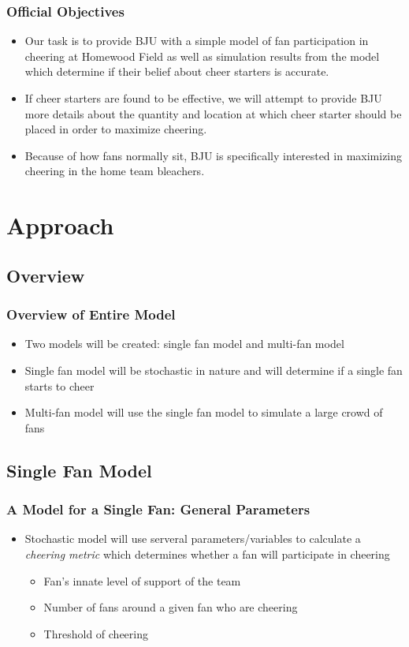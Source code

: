 \documentclass[compress,handout,10pt]{beamer}
\let\olditem\item
\renewcommand{\item}{\setlength{\itemsep}{0.5\baselineskip}\olditem}
\begin{document}
\begin{frame}
	\frametitle {Official Objectives}
	\begin {itemize}
		\item Our task is to provide BJU with a simple model of fan participation in cheering at Homewood Field as well as simulation results from the model which determine if their belief about cheer starters is accurate. 
		\item If cheer starters are found to be effective, we will attempt to provide BJU more details about the quantity and location at which cheer starter should be placed in order to maximize cheering.
		\item Because of how fans normally sit, BJU is specifically interested in maximizing cheering in the home team bleachers.
	\end {itemize} 
\end{frame}

\section {Approach}

\subsection {Overview}

\begin {frame}
	\frametitle {Overview of Entire Model}
	\begin{itemize}
		\item Two models will be created: single fan model and multi-fan model
		\item Single fan model will be stochastic in nature and will determine if a single fan starts to cheer
		\item Multi-fan model will use the single fan model to simulate a large crowd of fans
	\end{itemize}
\end {frame}

\subsection{Single Fan Model}

\begin {frame}
	\frametitle {A Model for a Single Fan: General Parameters}
	\begin{itemize}
		\item Stochastic model will use serveral parameters/variables to calculate a \emph{cheering metric} which determines whether a fan will participate in cheering
		\begin{itemize}
			\item Fan's innate level of support of the team
			\item Number of fans around a given fan who are cheering
			\item Threshold of cheering 
		\end{itemize}
	\end {itemize}
\end {frame}
\end{document}
